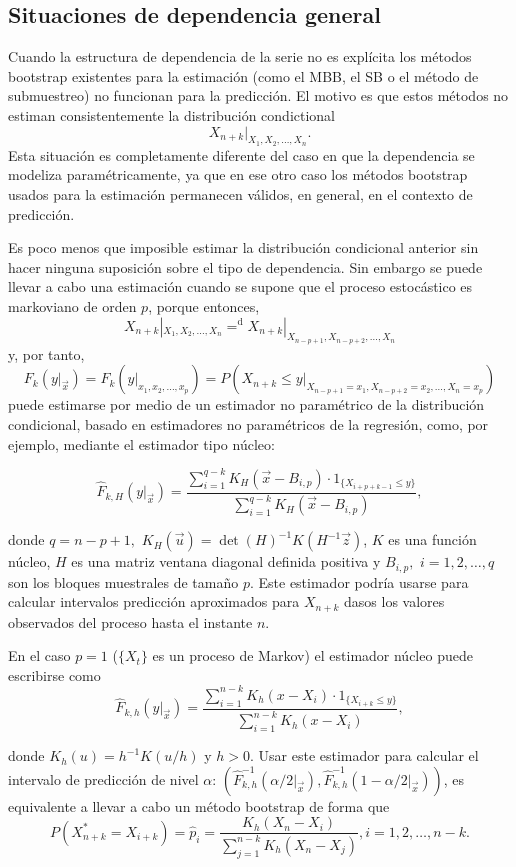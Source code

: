 \documentclass[]{book}
\theoremstyle{break}
\theoremstyle{definition}
\theoremstyle{definition}
\theoremstyle{definition}
\theoremstyle{remark}
\begin{document}
\subsection{Situaciones de dependencia
general}\label{situaciones-de-dependencia-general-2}

Cuando la estructura de dependencia de la serie no es explícita los
métodos bootstrap existentes para la estimación (como el MBB, el SB o el
método de submuestreo) no funcionan para la predicción. El motivo es que
estos métodos no estiman consistentemente la distribución condictional
\[X_{n+k}|_{X_1,X_2,\ldots ,X_n}.\] Esta situación es completamente
diferente del caso en que la dependencia se modeliza paramétricamente,
ya que en ese otro caso los métodos bootstrap usados para la estimación
permanecen válidos, en general, en el contexto de predicción.

Es poco menos que imposible estimar la distribución condicional anterior
sin hacer ninguna suposición sobre el tipo de dependencia. Sin embargo
se puede llevar a cabo una estimación cuando se supone que el proceso
estocástico es markoviano de orden \(p\), porque entonces,
\[X_{n+k}|_{X_1,X_2,\ldots ,X_n}{=}^{\mathrm{d}
}X_{n+k}|_{X_{n-p+1},X_{n-p+2},\ldots ,X_n}\]y, por tanto,
\[F_{k}(y|_{\vec{x}})=F_{k}(y|_{x_1,x_2,\ldots ,x_{p}})=P\left(
X_{n+k}\leq y|_{X_{n-p+1}=x_1,X_{n-p+2}=x_2,\ldots ,X_n=x_{p}} \right)\]puede
estimarse por medio de un estimador no paramétrico de la distribución
condicional, basado en estimadores no paramétricos de la regresión,
como, por ejemplo, mediante el estimador tipo núcleo:

\[\widehat{F}_{k,H}(y|_{\vec{x}})=\frac{\sum_{i=1}^{q-k}K_{H}(\vec{x}
-B_{i,p})\cdot 1_{\{X_{i+p+k-1}\leq y\}}}{\sum_{i=1}^{q-k}K_{H}(\vec{x}
-B_{i,p})},\]

donde \(q=n-p+1,\) \(K_{H}(\vec{u})=\det (H)^{-1}K(H^{-1}\vec{z})\),
\(K\) es una función núcleo, \(H\) es una matriz ventana diagonal
definida positiva y \(B_{i,p},\) \(i=1,2,\ldots ,q\) son los bloques
muestrales de tamaño \(p\). Este estimador podría usarse para calcular
intervalos predicción aproximados para \(X_{n+k}\) dasos los valores
observados del proceso hasta el instante \(n\).

En el caso \(p=1\) (\(\{X_{t}\}\) es un proceso de Markov) el estimador
núcleo puede escribirse
como\[\widehat{F}_{k,h}(y|_{\vec{x}})=\frac{\sum_{i=1}^{n-k}K_{h}(x-X_i)\cdot
1_{\{X_{i+k}\leq y\}}}{\sum_{i=1}^{n-k}K_{h}(x-X_i)},\]

donde \(K_{h}(u)=h^{-1}K(u/h)\) y \(h>0\). Usar este estimador para
calcular el intervalo de predicción de nivel \(\alpha\):
\(\left( \widehat{F} _{k,h}^{-1}(\alpha /2|_{\vec{x}}),\widehat{F}_{k,h}^{-1}(1-\alpha /2|_{\vec{x }}) \right)\),
es equivalente a llevar a cabo un método bootstrap de forma
que\[P\left( X_{n+k}^{\ast}=X_{i+k} \right) =\widehat{p}_i=\frac{
K_{h}(X_n-X_i)}{\sum_{j=1}^{n-k}K_{h}(X_n-X_j)}\mathrm{,}
i=1,2,\ldots ,n-k.\]
\end{document}
